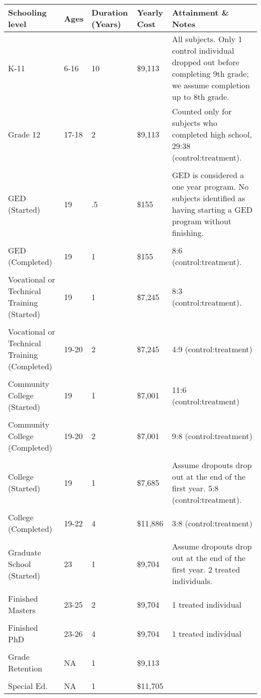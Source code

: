 \begin{tabular}{C{3.5cm} C{1.5cm} C{1.5cm} C{2cm} C{6.5cm}}
\hline \hline
Schooling level & Ages & Duration (Years) & Yearly Cost &Attainment \& Notes\\ \hline
K-11 & 6-16 & 10 &   \$9,113  & All subjects. Only 1 control individual dropped out before completing 9th grade; we assume completion up to 8th grade. \\
Grade 12 & 17-18 & 2 &  \$9,113  & Counted only for subjects who completed high school, 29:38 (control:treatment).\\ \\
GED (Started) & 19 & .5 &  \$155& GED is considered a one year program. No subjects identified as having starting a GED program without finishing.\\ \\
GED (Completed) & 19 & 1 & \$155 & 8:6 (control:treatment).\\ \\
Vocational or Technical Training (Started)& 19 & 1 & \$7,245 & 8:3  (control:treatment).\\ \\
Vocational or Technical Training (Completed)& 19-20 & 2 &  \$7,245 &  4:9 (control:treatment)\\ \\
Community College (Started) &   19 & 1 &  \$7,001 & 11:6 (control:treatment) \\ \\
Community College (Completed) & 19-20 & 2 &  \$7,001 & 9:8 (control:treatment)\\ \\
 College (Started)   &  19 & 1 &  \$7,685& Assume dropouts drop out at the end of the first year. 5:8 (control:treatment).\\ \\
 College (Completed) &  19-22 & 4 & \$11,886 & 3:8 (control:treatment)\\ \\
Graduate School (Started) & 23 & 1 &  \$9,704& Assume dropouts drop out at the end of the first year. 2 treated individuals.\\ \\
 Finished Masters &  23-25 & 2 &  \$9,704& 1 treated individual\\ \\
 Finished PhD & 23-26 & 4 & \$9,704 & 1 treated individual\\ \\
 \midrule
 Grade Retention& NA & 1 &\$9,113 & \\ \\
 Special Ed.& NA & 1 &  \$11,705  & \\ 
 \hline \hline 
 \end{tabular}
